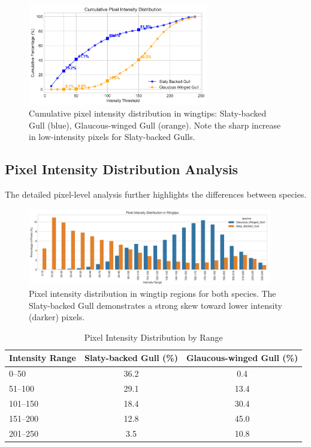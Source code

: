 \documentclass[a4paper,12pt]{report}
\begin{document}
\begin{figure}[H]
    \centering
    \includegraphics[width=0.7\textwidth]{images/REPORT_IMAGES_INTENSITY/I2/CUMULATIVE.png}
    \caption{Cumulative pixel intensity distribution in wingtips: Slaty-backed Gull (blue), Glaucous-winged Gull (orange). Note the sharp increase in low-intensity pixels for Slaty-backed Gulls.}
    \label{fig:cumulative_dist}
\end{figure}

\subsection{Pixel Intensity Distribution Analysis}

The detailed pixel-level analysis further highlights the differences between species.

\begin{figure}[H]
    \centering
    \includegraphics[width=0.95\textwidth]{images/REPORT_IMAGES_INTENSITY/I2/TIPdistribution.png}
    \caption{Pixel intensity distribution in wingtip regions for both species. The Slaty-backed Gull demonstrates a strong skew toward lower intensity (darker) pixels.}
    \label{fig:tip_distribution}
\end{figure}

\begin{table}[H]
    \centering
    \caption{Pixel Intensity Distribution by Range}
    \label{tab:intensitydist}
    \begin{tabular}{lcc}
        \toprule
        Intensity Range & Slaty-backed Gull (\%) & Glaucous-winged Gull (\%) \\
        \midrule
        0--50   & 36.2 & 0.4 \\
        51--100 & 29.1 & 13.4 \\
        101--150& 18.4 & 30.4 \\
        151--200& 12.8 & 45.0 \\
        201--250& 3.5  & 10.8 \\
        \bottomrule
    \end{tabular}
\end{table}
\end{document}
